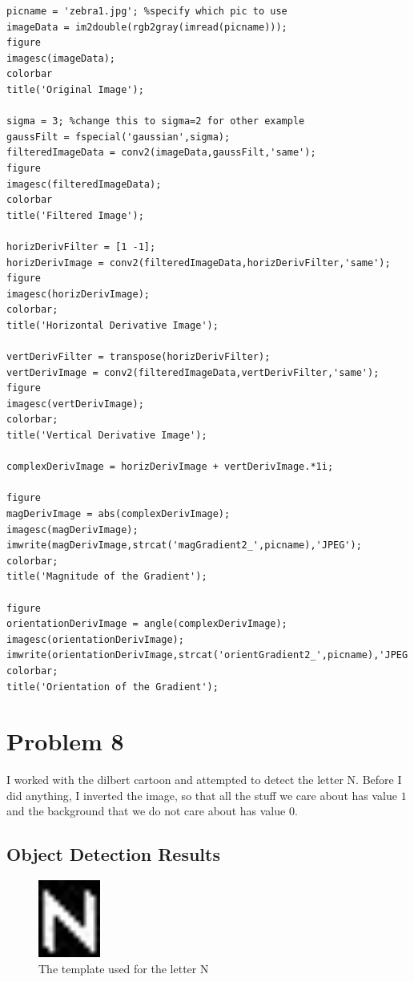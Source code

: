 \documentclass[11pt,psfig]{article}
\begin{document}
\begin{verbatim}
picname = 'zebra1.jpg'; %specify which pic to use
imageData = im2double(rgb2gray(imread(picname)));
figure
imagesc(imageData);
colorbar
title('Original Image');

sigma = 3; %change this to sigma=2 for other example
gaussFilt = fspecial('gaussian',sigma);
filteredImageData = conv2(imageData,gaussFilt,'same');
figure
imagesc(filteredImageData);
colorbar
title('Filtered Image');

horizDerivFilter = [1 -1];
horizDerivImage = conv2(filteredImageData,horizDerivFilter,'same');
figure
imagesc(horizDerivImage);
colorbar;
title('Horizontal Derivative Image');

vertDerivFilter = transpose(horizDerivFilter);
vertDerivImage = conv2(filteredImageData,vertDerivFilter,'same');
figure
imagesc(vertDerivImage);
colorbar;
title('Vertical Derivative Image');

complexDerivImage = horizDerivImage + vertDerivImage.*1i;

figure
magDerivImage = abs(complexDerivImage);
imagesc(magDerivImage);
imwrite(magDerivImage,strcat('magGradient2_',picname),'JPEG');
colorbar;
title('Magnitude of the Gradient');

figure
orientationDerivImage = angle(complexDerivImage);
imagesc(orientationDerivImage);
imwrite(orientationDerivImage,strcat('orientGradient2_',picname),'JPEG');
colorbar;
title('Orientation of the Gradient');
\end{verbatim}

\newpage

\section*{Problem 8}

I worked with the dilbert cartoon and attempted to detect the letter N. Before I did anything, I inverted the image, so that all the stuff we care about has value $1$ and the background that we do not care about has value $0$. 

\subsection*{Object Detection Results}

\begin{figure}[H]
\centering
\includegraphics[height=1in]{template_dilbert1.jpg}
\caption{The template used for the letter N}
\end{figure}
\end{document}
